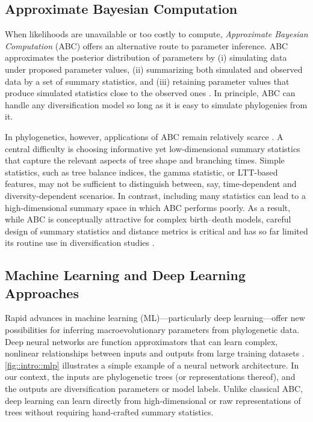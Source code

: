 \subsection{Approximate Bayesian Computation}
When likelihoods are unavailable or too costly to compute, \emph{Approximate Bayesian Computation} (ABC) offers an alternative route to parameter inference. ABC approximates the posterior distribution of parameters by (i) simulating data under proposed parameter values, (ii) summarizing both simulated and observed data by a set of summary statistics, and (iii) retaining parameter values that produce simulated statistics close to the observed ones \citep{beaumont_approximate_2002,beaumont_approximate_2010}. In principle, ABC can handle any diversification model so long as it is easy to simulate phylogenies from it.

In phylogenetics, however, applications of ABC remain relatively scarce \citep{rabosky_heritability_2009,bokma_time_2010,kutsukake_simulation-based_2013,xie_can_2023}. A central difficulty is choosing informative yet low-dimensional summary statistics that capture the relevant aspects of tree shape and branching times. Simple statistics, such as tree balance indices, the gamma statistic, or LTT-based features, may not be sufficient to distinguish between, say, time-dependent and diversity-dependent scenarios. In contrast, including many statistics can lead to a high-dimensional summary space in which ABC performs poorly. As a result, while ABC is conceptually attractive for complex birth--death models, careful design of summary statistics and distance metrics is critical and has so far limited its routine use in diversification studies \citep{xie_can_2023}.

\subsection{Machine Learning and Deep Learning Approaches}
Rapid advances in machine learning (ML)---particularly deep learning---offer new possibilities for inferring macroevolutionary parameters from phylogenetic data. Deep neural networks are function approximators that can learn complex, nonlinear relationships between inputs and outputs from large training datasets \citep{aggarwal_neural_2018}. \autoref{fig::intro::mlp} illustrates a simple example of a neural network architecture. In our context, the inputs are phylogenetic trees (or representations thereof), and the outputs are diversification parameters or model labels. Unlike classical ABC, deep learning can learn directly from high-dimensional or raw representations of trees without requiring hand-crafted summary statistics.


